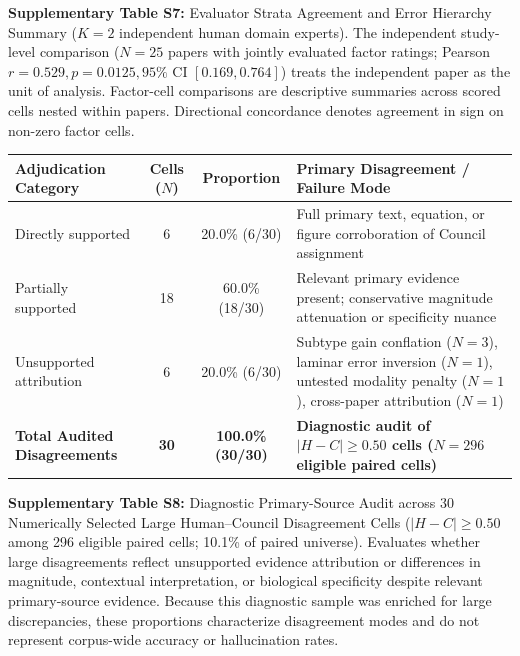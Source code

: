 \documentclass[12pt]{article}
\begin{document}
\noindent\textbf{Supplementary Table S7:} Evaluator Strata Agreement and Error Hierarchy Summary ($K=2$ independent human domain experts). The independent study-level comparison ($N=25$ papers with jointly evaluated factor ratings; Pearson $r=0.529, p=0.0125, 95\%\text{ CI } [0.169, 0.764]$) treats the independent paper as the unit of analysis. Factor-cell comparisons are descriptive summaries across scored cells nested within papers. Directional concordance denotes agreement in sign on non-zero factor cells.

\vspace{1.5em}

\begingroup
\small
\setlength{\tabcolsep}{4pt}
\noindent\begin{tabularx}{\textwidth}{@{}l c c >{\raggedright\arraybackslash}X@{}}
\toprule
\textbf{Adjudication Category} & \textbf{Cells ($N$)} & \textbf{Proportion} & \textbf{Primary Disagreement / Failure Mode} \\
\midrule
Directly supported & 6 & 20.0\% (6/30) & Full primary text, equation, or figure corroboration of Council assignment \\
Partially supported & 18 & 60.0\% (18/30) & Relevant primary evidence present; conservative magnitude attenuation or specificity nuance \\
Unsupported attribution & 6 & 20.0\% (6/30) & Subtype gain conflation ($N=3$), laminar error inversion ($N=1$), untested modality penalty ($N=1$), cross-paper attribution ($N=1$) \\
\midrule
\textbf{Total Audited Disagreements} & \textbf{30} & \textbf{100.0\% (30/30)} & \textbf{Diagnostic audit of $|H - C| \ge 0.50$ cells ($N=296$ eligible paired cells)} \\
\bottomrule
\end{tabularx}
\endgroup
\vspace{0.4em}

\noindent\textbf{Supplementary Table S8:} Diagnostic Primary-Source Audit across 30 Numerically Selected Large Human--Council Disagreement Cells ($|H - C| \ge 0.50$ among 296 eligible paired cells; 10.1\% of paired universe). Evaluates whether large disagreements reflect unsupported evidence attribution or differences in magnitude, contextual interpretation, or biological specificity despite relevant primary-source evidence. Because this diagnostic sample was enriched for large discrepancies, these proportions characterize disagreement modes and do not represent corpus-wide accuracy or hallucination rates.
\end{document}

